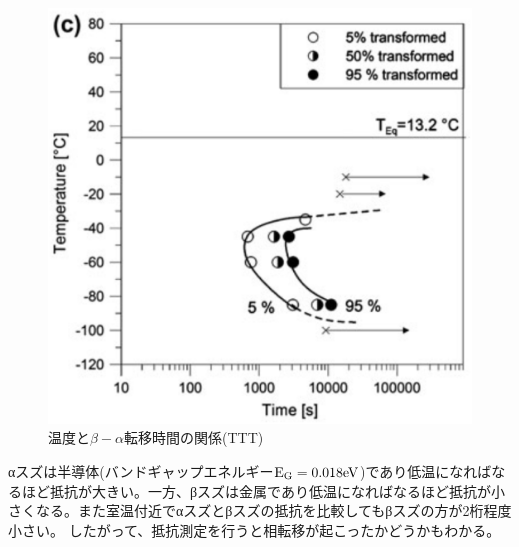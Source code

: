 \begin{figure}[!h]
    \begin{center}
   \includegraphics[width=0.6\hsize]{Introduction/TTT.eps}
  \end{center}
  \caption{温度と$\beta-\alpha$転移時間の関係(TTT)\cite{Nogita}}
  \label{fig:TTT}
\end{figure}

αスズは半導体(バンドギャップエネルギー$\rm E_G=0.018eV$)であり低温になればなるほど抵抗が大きい。一方、βスズは金属であり低温になればなるほど抵抗が小さくなる。また室温付近でαスズとβスズの抵抗を比較してもβスズの方が2桁程度小さい。\cite{} したがって、抵抗測定を行うと相転移が起こったかどうかもわかる。



